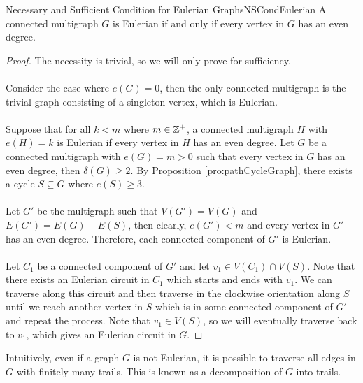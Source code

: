 \documentclass[math, code]{amznotes}
\theoremstyle{remark}
\begin{document}
\begin{thmbox}{Necessary and Sufficient Condition for Eulerian Graphs}{NSCondEulerian}
    A connected multigraph $G$ is Eulerian if and only if every vertex in $G$ has an even degree.
    \tcblower
    \begin{proof}
        The necessity is trivial, so we will only prove for sufficiency.
        \\\\
        Consider the case where $e(G) = 0$, then the only connected multigraph is the trivial graph consisting of a singleton vertex, which is Eulerian. 
        \\\\
        Suppose that for all $k < m$ where $m \in \mathbb{Z}^+$, a connected multigraph $H$ with $e(H) = k$ is Eulerian if every vertex in $H$ has an even degree. Let $G$ be a connected multigraph with $e(G) = m > 0$ such that every vertex in $G$ has an even degree, then $\delta(G) \geq 2$. By Proposition \ref{pro:pathCycleGraph}, there exists a cycle $S \subseteq G$ where $e(S) \geq 3$.
        \\\\
        Let $G'$ be the multigraph such that $V(G') = V(G)$ and $E(G') = E(G) - E(S)$, then clearly, $e(G') < m$ and every vertex in $G'$ has an even degree. Therefore, each connected component of $G'$ is Eulerian.
        \\\\
        Let $C_1$ be a connected component of $G'$ and let $v_1 \in V(C_1) \cap V(S)$. Note that there exists an Eulerian circuit in $C_1$ which starts and ends with $v_1$. We can traverse along this circuit and then traverse in the clockwise orientation along $S$ until we reach another vertex in $S$ which is in some connected component of $G'$ and repeat the process. Note that $v_1 \in V(S)$, so we will eventually traverse back to $v_1$, which gives an Eulerian circuit in $G$.
    \end{proof}
\end{thmbox}
Intuitively, even if a graph $G$ is not Eulerian, it is possible to traverse all edges in $G$ with finitely many trails. This is known as a decomposition of $G$ into trails.
\end{document}
